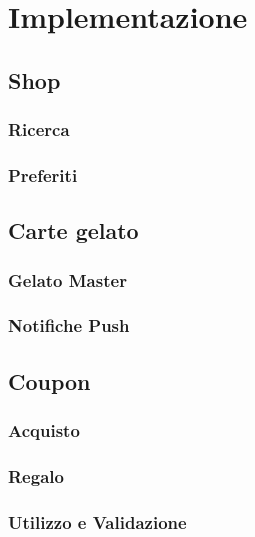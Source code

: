 \section{Implementazione}

\subsection{Shop}

\subsubsection{Ricerca}

\subsubsection{Preferiti}

\subsection{Carte gelato}

\subsubsection{Gelato Master}

\subsubsection{Notifiche Push}

\subsection{Coupon}

\subsubsection{Acquisto}

\subsubsection{Regalo}

\subsubsection{Utilizzo e Validazione}

\newpage